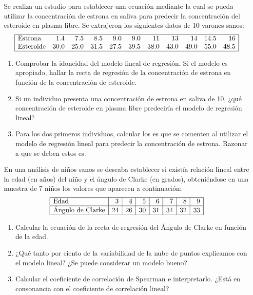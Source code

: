 {Se realiza un estudio para establecer una ecuación mediante la cual se pueda utilizar la concentración de estrona en saliva para predecir
la concentración del esteroide en plasma libre. Se extrajeron los siguientes datos de 10 varones sanos:
\[
\begin{array}{|lrrrrrrrrrr|}
\hline
\text{Estrona} & 1.4 & 7.5 & 8.5 & 9.0 & 9.0 & 11 & 13 & 14 & 14.5 & 16\\
\text{Esteroide} & 30.0 & 25.0 & 31.5 & 27.5 & 39.5 & 38.0 & 43.0 & 49.0 & 55.0 & 48.5\\
\hline
\end{array}
\]

\begin{enumerate}
\item Comprobar la idoneidad del modelo lineal de regresión. Si el modelo es apropiado, hallar la recta de regresión de la concentración de
estrona en función de la concentración de esteroide.
\item Si un individuo presenta una concentración de estrona en saliva de 10, ¿qué concentración de esteroide en plasma libre
predeciría el modelo de regresión lineal?
\item Para los dos primeros individuos, calcular los es que se comenten al utilizar el modelo de regresión lineal para
predecir la concentración de estrona. Razonar a que se deben estos es.
\end{enumerate}
}
{
}
{
}


{En una análisis de niños sanos se deseaba establecer si existía relación lineal entre la edad (en años) del niño y el ángulo de Clarke (en
grados), obteniéndose en una muestra de 7 niños los valores que aparecen a continuación:
\[
\begin{array}{|l|r|r|r|r|r|r|r|}
\hline
\text{Edad} & 3 & 4 & 5 & 6 & 7 & 8 & 9 \\
\hline
\text{Ángulo de Clarke} & 24 & 26 & 30 & 31 & 34 & 32 & 33\\
\hline
\end{array}
\]
\begin{enumerate}
\item Calcular la ecuación de la recta de regresión del Ángulo de Clarke en función de la edad.
\item ¿Qué tanto por ciento de la variabilidad de la nube de puntos explicamos con el modelo lineal? ¿Se puede considerar un modelo
bueno?
\item Calcular el coeficiente de correlación de Spearman e interpretarlo. ¿Está en consonancia con el coeficiente de correlación lineal?
\end{enumerate}
}
{
}
{
}


